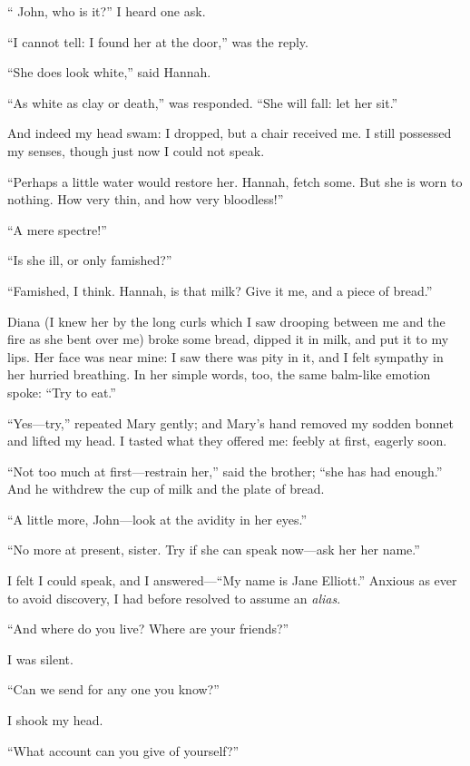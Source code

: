\enquote{\St{} John, who is it?} I heard one ask.

\enquote{I cannot tell: I found her at the door,} was the reply.

\enquote{She does look white,} said Hannah.

\enquote{As white as clay or death,} was responded. \enquote{She will
	fall: let her sit.}

And indeed my head swam: I dropped, but a chair received me. I still
possessed my senses, though just now I could not speak.

\enquote{Perhaps a little water would restore her. Hannah, fetch some.
	But she is worn to nothing. How very thin, and how very bloodless!}

\enquote{A mere spectre!}

\enquote{Is she ill, or only famished?}

\enquote{Famished, I think. Hannah, is that milk? Give it me, and a
	piece of bread.}

Diana (I knew her by the long curls which I saw drooping between me and
the fire as she bent over me) broke some bread, dipped it in milk, and
put it to my lips. Her face was near mine: I saw there was pity in it,
and I felt sympathy in her hurried breathing. In her simple words, too,
the same balm-like emotion spoke: \enquote{Try to eat.}

\enquote{Yes---try,} repeated Mary gently; and Mary's hand removed my
sodden bonnet and lifted my head. I tasted what they offered me: feebly
at first, eagerly soon.

\enquote{Not too much at first---restrain her,} said the brother;
\enquote{she has had enough.} And he withdrew the cup of milk and the
plate of bread.

\enquote{A little more, \St{} John---look at the avidity in her eyes.}

\enquote{No more at present, sister. Try if she can speak now---ask her
	her name.}

I felt I could speak, and I answered---\enquote{My name is Jane
	Elliott.} Anxious as ever to avoid discovery, I had before resolved to
assume an \emph{alias}.

\enquote{And where do you live? Where are your friends?}

I was silent.

\enquote{Can we send for any one you know?}

I shook my head.

\enquote{What account can you give of yourself?}

